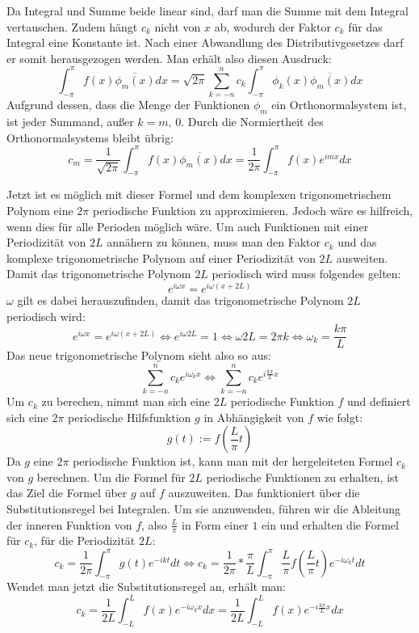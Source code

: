 \documentclass[a4paper,12pt]{article}
\begin{document}
Da Integral und Summe beide linear sind, darf man die Summe mit dem Integral vertauschen. 
Zudem hängt $c_k$ nicht von $x$ ab, wodurch der Faktor $c_k$ für das Integral eine Konstante ist. 
Nach einer Abwandlung des Distributivgesetzes darf er somit herausgezogen werden. Man erhält 
also diesen Ausdruck: 
$$\int_{-\pi}^\pi{f(x)\overline{\phi_m(x)} dx} = \sqrt{2\pi}\sum_{k=-n}^{n}{c_k\int_{-\pi}^\pi{\phi_k(x) \overline{\phi_m(x)} dx}}$$
Aufgrund dessen, dass die Menge der Funktionen $\phi_m$ ein Orthonormalsystem ist, ist jeder Summand, außer $k = m$, 0. Durch die Normiertheit des Orthonormalsystems bleibt übrig:
$$c_m = \frac{1}{\sqrt{2\pi}}\int_{-\pi}^\pi{f(x)\overline{\phi_m(x)}dx} = \frac{1}{2\pi}\int_{-\pi}^\pi{f(x)e^{imx}dx}$$ 

Jetzt ist es möglich mit dieser Formel und dem komplexen trigonometrischem Polynom eine 
$2\pi$ periodische Funktion zu approximieren. Jedoch wäre es hilfreich, wenn dies für alle 
Perioden möglich wäre. Um auch Funktionen mit einer Periodizität von $2L$ annähern zu können, 
muss man den Faktor $c_k$ und das komplexe trigonometrische Polynom auf einer Periodizität von $2L$ ausweiten. 
Damit das trigonometrische Polynom $2L$ periodisch wird muss folgendes gelten: 
$$e^{i\omega x} = e^{i\omega(x+2L)}$$
$\omega$ gilt es dabei herauszufinden, damit das trigonometrische Polynom $2L$ periodisch wird:
$$e^{i\omega x} = e^{i\omega(x+2L)} \Leftrightarrow e^{i\omega 2L} = 1 \Leftrightarrow \omega 2L = 2\pi k \Leftrightarrow \omega_k = \frac{k\pi}{L}$$
Das neue trigonometrische Polynom sieht also so aus:
$$\sum_{k=-n}^n{c_k e^{i\omega_kx}} \Leftrightarrow \sum_{k=-n}^n{c_k e^{i\frac{k\pi}{L}x}}$$
Um $c_k$ zu berechen, nimmt man sich eine $2L$ periodische Funktion $f$ und definiert sich eine $2\pi$ periodische 
Hilfsfunktion $g$ in Abhängigkeit von $f$ wie folgt:
$$g(t) := f\left(\frac{L}{\pi}t\right) $$
Da $g$ eine $2\pi$ periodische Funktion ist, kann man mit der hergeleiteten Formel $c_k$ 
von $g$ berechnen. Um die Formel für $2L$ periodische Funktionen zu erhalten, ist das 
Ziel die Formel über $g$ auf $f$ auszuweiten. Das funktioniert über die Substitutionsregel 
bei Integralen. Um sie anzuwenden, führen wir die Ableitung der inneren Funktion von $f$, 
also $\frac{L}{\pi}$ in Form einer $1$ ein und erhalten die Formel für $c_k$, für die 
Periodizität $2L$: 
$$c_k = \frac{1}{2\pi} \int_{-\pi}^\pi{g(t)e^{-ikt}dt} \Leftrightarrow c_k = \frac{1}{2\pi}*\frac{\pi}{L} \int_{-\pi}^{\pi}{\frac{L}{\pi}f\left(\frac{L}{\pi}t\right)e^{-i\omega_kt} dt}$$
Wendet man jetzt die Substitutionsregel an, erhält man: 
$$c_k = \frac{1}{2L}\int_{-L}^{L}{f(x)e^{-i\omega_kx}dx} = \frac{1}{2L}\int_{-L}^{L}{f(x)e^{-i\frac{k\pi}{L}x}dx}$$
\end{document}
